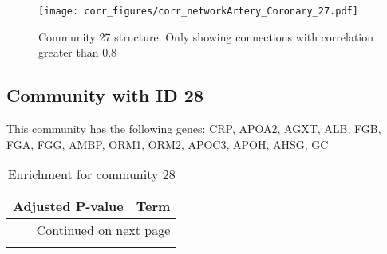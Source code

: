 \begin{figure}[h!]
\centering
\texttt{[image: corr\_figures/corr\_networkArtery\_Coronary\_27.pdf]}
\caption{Community 27 structure. Only showing connections with correlation greater than 0.8}
\end{figure}




\subsection*{Community with ID 28}
This community has the following genes: CRP, APOA2, AGXT, ALB, FGB, FGA, FGG, AMBP, ORM1, ORM2, APOC3, APOH, AHSG, GC
\\
\begin{longtable}{p{2.4cm}p{14.5cm}}
\caption{Enrichment for community 28}\\
\toprule
Adjusted \newline P-value &                                                                                          Term \\
\midrule
\endhead
\midrule
\multicolumn{2}{r}{{Continued on next page}} \\
\midrule
\endfoot


\end{longtable}
